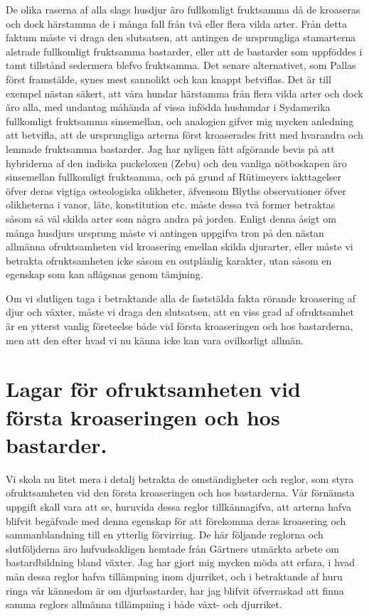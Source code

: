 De olika raserna af alla slags husdjur äro fullkomligt fruktsamma då de kroaseras och dock härstamma de i många fall från två eller flera vilda arter. Från detta faktum måste vi draga den slutsatsen, att antingen de ursprungliga stamarterna alstrade fullkomligt fruktsamma bastarder, eller att de bastarder som uppföddes i tamt tillstånd sedermera blefvo fruktsamma. Det senare alternativet, som Pallas först framstälde, synes mest sannolikt och kan knappt betviflas. Det är till exempel nästan säkert, att våra hundar härstamma från flera vilda arter och dock äro alla, med undantag måhända af vissa infödda hushundar i Sydamerika fullkomligt fruktsamma sinsemellan, och analogien gifver mig mycken anledning att betvifla, att de ursprungliga arterna först kroaserades fritt med hvarandra och lemnade fruktsamma bastarder. Jag har nyligen fått afgörande bevis på att hybriderna af den indiska puckeloxen (Zebu) och den vanliga nötboskapen äro sinsemellan fullkomligt fruktsamma, och på grund af Rütimeyers iakttagelser öfver deras vigtiga osteologiska olikheter, äfvensom Blyths observationer öfver olikheterna i vanor, läte, konstitution etc. måste dessa två former betraktas såsom så väl skilda arter som några andra på jorden. Enligt denna åsigt om många husdjurs ursprung måste vi antingen uppgifva tron på den nästan allmänna ofruktsamheten vid kroasering emellan skilda djurarter, eller måste vi betrakta ofruktsamheten icke såsom en outplånlig karakter, utan såsom en egenskap som kan aflägsnas genom tämjning.

Om vi slutligen taga i betraktande alla de faststälda fakta rörande kroasering af djur och växter, måste vi draga den slutsatsen, att en viss grad af ofruktsamhet är en ytterst vanlig företeelse både vid första kroaseringen och hos bastarderna, men att den efter hvad vi nu känna icke kan vara ovilkorligt allmän.



\section[Lagar för ofruktsamhet]{Lagar för ofruktsamheten vid första kroaseringen
och hos bastarder.}

Vi skola nu litet mera i detalj betrakta de omständigheter och reglor, som styra ofruktsamheten vid den första kroaseringen och hos bastarderna. Vår förnämsta uppgift skall vara att se, huruvida dessa reglor tillkännagifva, att arterna hafva blifvit begåfvade med denna egenskap för att förekomma deras kroasering och sammanblandning till en ytterlig förvirring. De här följande reglorna och slutföljderna äro hufvudsakligen hemtade från Gärtners utmärkta arbete om bastardbildning bland växter. Jag har gjort mig mycken möda att erfara, i hvad mån dessa reglor hafva tillämpning inom djurriket, och i betraktande af huru ringa vår kännedom är om djurbastarder, har jag blifvit öfverraskad att finna samma reglors allmänna tillämpning i både växt- och djurriket.

